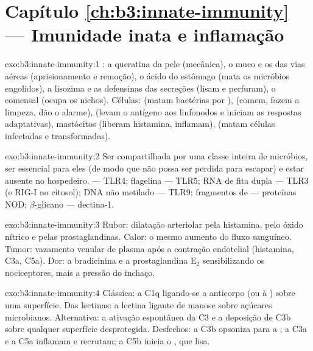 \section*{Capítulo \ref{ch:b3:innate-immunity} --- Imunidade inata e inflamação}

\begin{solution}{exo:b3:innate-immunity:1}
: a queratina da pele (mecânica), o muco e os  das vias
aéreas (aprisionamento e remoção), o ácido do estômago (mata os
micróbios engolidos), a lisozima e as defensinas das secreções (lisam e
perfuram), o  comensal (ocupa os nichos). Células:
 (matam bactérias por ),  (comem, fazem
a limpeza, dão o alarme),  (levam o antígeno aos
linfonodos e iniciam as respostas adaptativas), mastócitos (liberam
histamina, inflamam),  (matam células infectadas
e transformadas).
\end{solution}

\begin{solution}{exo:b3:innate-immunity:2}
Ser compartilhada por uma classe inteira de micróbios, ser essencial
para eles (de modo que não possa ser perdida para escapar) e estar
ausente no hospedeiro.  --- TLR4; flagelina --- TLR5;
RNA de fita dupla --- TLR3 (e RIG-I no citosol); DNA  não metilado
--- TLR9; fragmentos de  --- proteínas NOD;
$\beta$-glicano --- dectina-1.
\end{solution}

\begin{solution}{exo:b3:innate-immunity:3}
Rubor: dilatação arteriolar pela histamina, pelo óxido nítrico e pelas
prostaglandinas. Calor: o mesmo aumento do fluxo sanguíneo. Tumor:
vazamento venular de plasma após a contração endotelial (histamina,
C3a, C5a). Dor: a bradicinina e a prostaglandina E$_{2}$ sensibilizando
os nociceptores, mais a pressão do inchaço.
\end{solution}

\begin{solution}{exo:b3:innate-immunity:4}
Clássica: a C1q ligando-se a anticorpo (ou à ) sobre
uma superfície. Das lectinas: a lectina ligante de manose sobre
açúcares microbianos. Alternativa: a ativação espontânea da C3 e a
deposição de C3b sobre qualquer superfície desprotegida. Desfechos: a
C3b opsoniza para a ; a C3a e a C5a inflamam e recrutam; a
C5b inicia o , que lisa.
\end{solution}

